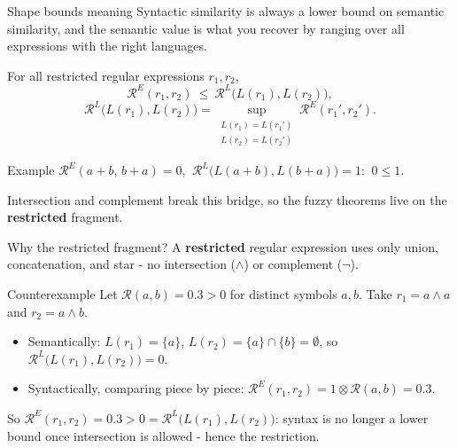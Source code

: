 \documentclass[aspectratio=169]{beamer}
\newcommand{\cR}{\mathcal{R}}
\begin{document}
\begin{frame}{Shape bounds meaning}
  \small
  Syntactic similarity is always a lower bound on semantic similarity, and the
  semantic value is what you recover by ranging over all expressions with the
  right languages.
  \begin{theorem}[Bridge between $\cR^E$ and $\cR^L$]
    For all restricted regular expressions $r_1,r_2$,
    \[
      \cR^E(r_1,r_2)\ \le\ \cR^L\big(L(r_1),L(r_2)\big),
    \]
    \[
      \cR^L\big(L(r_1),L(r_2)\big)=
      \sup_{\substack{L(r_1)=L(r_1')\\ L(r_2)=L(r_2')}}\cR^E(r_1',r_2').
    \]
  \end{theorem}
  \vfill
  \begin{block}{Example}
    $\cR^E(a{+}b,\,b{+}a)=0$, $\ \cR^L\big(L(a{+}b),L(b{+}a)\big)=1$:
    $\ 0\le 1$.
  \end{block}
  Intersection and complement break this bridge, so the fuzzy theorems live on
  the \textbf{restricted} fragment.
\end{frame}

\begin{frame}{Why the restricted fragment?}
  \small
  A \textbf{restricted} regular expression uses only union, concatenation,
  and star - no intersection ($\wedge$) or complement ($\neg$).
  \vfill
  \begin{block}{Counterexample}
    Let $\cR(a,b)=0.3>0$ for distinct symbols $a,b$. Take
    $r_1=a\wedge a$ and $r_2=a\wedge b$.
    \begin{itemize}
      \item Semantically: $L(r_1)=\{a\}$, $L(r_2)=\{a\}\cap\{b\}=\emptyset$,
        so $\cR^L\big(L(r_1),L(r_2)\big)=0$.
      \item Syntactically, comparing piece by piece:
        $\cR^E(r_1,r_2)=1\otimes\cR(a,b)=0.3$.
    \end{itemize}
  \end{block}
  \vfill
  So $\cR^E(r_1,r_2)=0.3>0=\cR^L\big(L(r_1),L(r_2)\big)$: syntax is no
  longer a lower bound once intersection is allowed - hence the restriction.
\end{frame}
\end{document}
